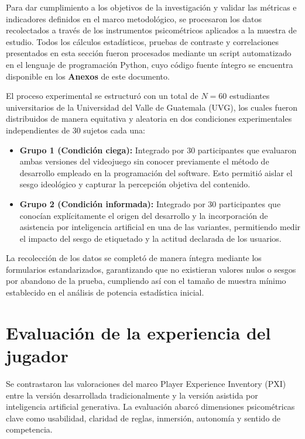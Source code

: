 Para dar cumplimiento a los objetivos de la investigación y validar las métricas e indicadores definidos en el marco metodológico, se procesaron los datos recolectados a través de los instrumentos psicométricos aplicados a la muestra de estudio. Todos los cálculos estadísticos, pruebas de contraste y correlaciones presentados en esta sección fueron procesados mediante un script automatizado en el lenguaje de programación Python, cuyo código fuente íntegro se encuentra disponible en los \textbf{Anexos} de este documento.

El proceso experimental se estructuró con un total de $N = 60$ estudiantes universitarios de la Universidad del Valle de Guatemala (UVG), los cuales fueron distribuidos de manera equitativa y aleatoria en dos condiciones experimentales independientes de 30 sujetos cada una:

\begin{itemize}
    \item \textbf{Grupo 1 (Condición ciega):} Integrado por 30 participantes que evaluaron ambas versiones del videojuego sin conocer previamente el método de desarrollo empleado en la programación del software. Esto permitió aislar el sesgo ideológico y capturar la percepción objetiva del contenido.
    \item \textbf{Grupo 2 (Condición informada):} Integrado por 30 participantes que conocían explícitamente el origen del desarrollo y la incorporación de asistencia por inteligencia artificial en una de las variantes, permitiendo medir el impacto del sesgo de etiquetado y la actitud declarada de los usuarios.
\end{itemize}

La recolección de los datos se completó de manera íntegra mediante los formularios estandarizados, garantizando que no existieran valores nulos o sesgos por abandono de la prueba, cumpliendo así con el tamaño de muestra mínimo establecido en el análisis de potencia estadística inicial.

\section{Evaluación de la experiencia del jugador}

Se contrastaron las valoraciones del marco Player Experience Inventory (PXI) entre la versión desarrollada tradicionalmente y la versión asistida por inteligencia artificial generativa. La evaluación abarcó dimensiones psicométricas clave como usabilidad, claridad de reglas, inmersión, autonomía y sentido de competencia.

